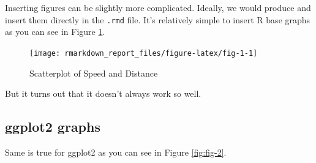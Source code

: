 \documentclass[
  12pt,
]{article}
\newenvironment{Shaded}{\begin{snugshade}}{\end{snugshade}}
\newcommand{\CharTok}[1]{\textcolor[rgb]{0.31,0.60,0.02}{#1}}
\newcommand{\CommentTok}[1]{\textcolor[rgb]{0.56,0.35,0.01}{\textit{#1}}}
\newcommand{\DataTypeTok}[1]{\textcolor[rgb]{0.13,0.29,0.53}{#1}}
\newcommand{\KeywordTok}[1]{\textcolor[rgb]{0.13,0.29,0.53}{\textbf{#1}}}
\newcommand{\NormalTok}[1]{#1}
\newcommand{\OperatorTok}[1]{\textcolor[rgb]{0.81,0.36,0.00}{\textbf{#1}}}
\newcommand{\StringTok}[1]{\textcolor[rgb]{0.31,0.60,0.02}{#1}}
\begin{document}
Inserting figures can be slightly more complicated. Ideally, we would produce and insert them directly in the \texttt{.rmd} file. It's relatively simple to insert R base graphs as you can see in Figure \ref{fig:fig-1}.

\begin{Shaded}
\end{Shaded}

\begin{figure}[H]

{\centering \texttt{[image: rmarkdown\_report\_files/figure-latex/fig-1-1]} 

}

\caption{Scatterplot of Speed and Distance}\label{fig:fig-1}
\end{figure}

But it turns out that it doesn't always work so well.

\hypertarget{ggplot2-graphs}{%
\subsection{ggplot2 graphs}\label{ggplot2-graphs}}

Same is true for ggplot2 as you can see in Figure \ref{fig:fig-2}.

\begin{Shaded}
\end{Shaded}
\end{document}
